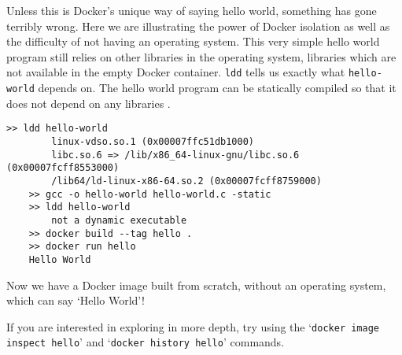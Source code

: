 Unless this is Docker's unique way of saying hello world, something has gone terribly wrong.
Here we are illustrating the power of Docker isolation as well as the difficulty of not having an operating system.
This very simple hello world program still relies on other libraries in the operating system, libraries which are not available in the empty Docker container.
\texttt{ldd} tells us exactly what \texttt{hello-world} depends on.
The hello world program can be statically compiled so that it does not depend on any libraries \cite{static-hello-world}.

\begin{shaded*}
\begin{lstlisting}[language=shell]
    >> ldd hello-world
        linux-vdso.so.1 (0x00007ffc51db1000)
        libc.so.6 => /lib/x86_64-linux-gnu/libc.so.6 (0x00007fcff8553000)
        /lib64/ld-linux-x86-64.so.2 (0x00007fcff8759000)
    >> gcc -o hello-world hello-world.c -static
    >> ldd hello-world
        not a dynamic executable
    >> docker build --tag hello .
    >> docker run hello
    Hello World
\end{lstlisting}
\end{shaded*}

Now we have a Docker image built from scratch, without an operating system, which can say `Hello World'!
\begin{extra}
If you are interested in exploring in more depth, try using the `\texttt{docker image inspect hello}'
and `\texttt{docker history hello}' commands.
\end{extra}




%
%
%
%
%
%
